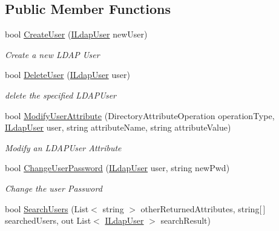 \subsection*{Public Member Functions}
\begin{DoxyCompactItemize}
\item 
bool \hyperlink{interface_l_d_a_p_library_1_1_interfarces_1_1_i_ldap_manager_acf17800591faca192d77abfc1e8cd741}{Create\+User} (\hyperlink{interface_l_d_a_p_library_1_1_interfarces_1_1_i_ldap_user}{I\+Ldap\+User} new\+User)
\begin{DoxyCompactList}\small\item\em Create a new L\+D\+A\+P User \end{DoxyCompactList}\item 
bool \hyperlink{interface_l_d_a_p_library_1_1_interfarces_1_1_i_ldap_manager_ab2c16e1f25ddc3b24d1d5d473ac92d3a}{Delete\+User} (\hyperlink{interface_l_d_a_p_library_1_1_interfarces_1_1_i_ldap_user}{I\+Ldap\+User} user)
\begin{DoxyCompactList}\small\item\em delete the specified L\+D\+A\+P\+User \end{DoxyCompactList}\item 
bool \hyperlink{interface_l_d_a_p_library_1_1_interfarces_1_1_i_ldap_manager_a4287136af0e5b29463399def7d235548}{Modify\+User\+Attribute} (Directory\+Attribute\+Operation operation\+Type, \hyperlink{interface_l_d_a_p_library_1_1_interfarces_1_1_i_ldap_user}{I\+Ldap\+User} user, string attribute\+Name, string attribute\+Value)
\begin{DoxyCompactList}\small\item\em Modify an L\+D\+A\+P\+User Attribute \end{DoxyCompactList}\item 
bool \hyperlink{interface_l_d_a_p_library_1_1_interfarces_1_1_i_ldap_manager_a3004e83a4a4bfcb2b6f4beec22baf09a}{Change\+User\+Password} (\hyperlink{interface_l_d_a_p_library_1_1_interfarces_1_1_i_ldap_user}{I\+Ldap\+User} user, string new\+Pwd)
\begin{DoxyCompactList}\small\item\em Change the user Password \end{DoxyCompactList}\item 
bool \hyperlink{interface_l_d_a_p_library_1_1_interfarces_1_1_i_ldap_manager_a11d2b2e2b4eaa12bce5cb448a921ca4c}{Search\+Users} (List$<$ string $>$ other\+Returned\+Attributes, string\mbox{[}$\,$\mbox{]} searched\+Users, out List$<$ \hyperlink{interface_l_d_a_p_library_1_1_interfarces_1_1_i_ldap_user}{I\+Ldap\+User} $>$ search\+Result)

\end{DoxyCompactItemize}
